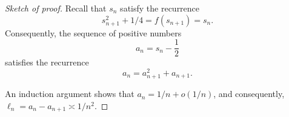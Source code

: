\begin{proof}[Sketch of proof] Recall that $s_n$ satisfy the recurrence
\begin{equation}
s_{n+1}^2 + 1/4 =f(s_{n+1})= s_n.
\end{equation}
Consequently, 
the sequence of positive numbers
$$
a_n = s_n-\frac{1}{2}
$$
satisfies the recurrence 
\begin{equation}
a_n = a_{n+1}^2+a_{n+1}.
\end{equation}

An induction argument shows that $a_n = 1/n + o(1/n)$, and consequently, $\ell_n = a_n - a_{n+1} \asymp 1/n^2$.




\end{proof}


